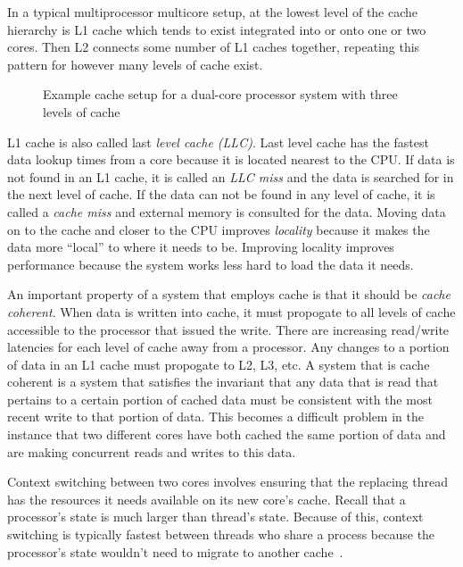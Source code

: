 \documentclass{sig-alternate}
\begin{document}
In a typical multiprocessor multicore setup, at the lowest level of the cache hierarchy is L1 cache which tends to exist integrated into or onto one or two cores. Then L2 connects some number of L1 caches together, repeating this pattern for however many levels of cache exist.


\begin{figure}
\centering
{}
\caption{Example cache setup for a dual-core processor system with three levels of cache}
\label{fig:cache}
\end{figure}


L1 cache is also called last \emph{level cache (LLC)}. Last level cache has the fastest data lookup times from a core because it is located nearest to the CPU. If data is not found in an L1 cache, it is called an \emph{LLC miss} and the data is searched for in the next level of cache. If the data can not be found in any level of cache, it is called a \emph{cache miss} and external memory is consulted for the data. Moving data on to the cache and closer to the CPU improves \emph{locality} because it makes the data more ``local'' to where it needs to be. Improving locality improves performance because the system works less hard to load the data it needs.~\cite{WikiCache}

An important property of a system that employs cache is that it should be \emph{cache coherent}. When data is written into cache, it must propogate to all levels of cache accessible to the processor that issued the write. There are increasing read/write latencies for each level of cache away from a processor. Any changes to a portion of data in an L1 cache must propogate to L2, L3, etc. A system that is cache coherent is a system that satisfies the invariant that any data that is read that pertains to a certain portion of cached data must be consistent with the most recent write to that portion of data. This becomes a difficult problem in the instance that two different cores have both cached the same portion of data and are making concurrent reads and writes to this data.~\cite{Systems}

Context switching between two cores involves ensuring that the replacing thread has the resources it needs available on its new core's cache. Recall that a processor's state is much larger than thread's state. Because of this, context switching is typically fastest between threads who share a process because the processor's state wouldn't need to migrate to another cache~\cite{WikiThreads}.
\end{document}
